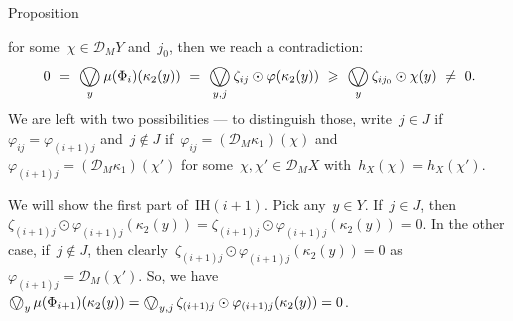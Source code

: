 \documentclass[b]{subfiles}
\begin{document}
\begin{parsec}
\begin{point}[aconvalmosteffectus]{Proposition}
\begin{point}
    for some~$\chi \in \mathcal{D}_M Y$ and~$j_0$,
    then we reach a contradiction:
\begin{equation*}
    0\ = \ 
    \bigovee_y \mu(\Phi_i)(\kappa_2(y))
    \ = \ \bigovee_{y,j} \zeta_{ij} \odot \varphi(\kappa_2(y))
    \ \geq \ \bigovee_y \zeta_{ij_0} \odot \chi(y)\  \neq\  0.
\end{equation*}
We are left with two possibilities ---
    to distinguish those,
    write~$j \in J$ if~$\varphi_{ij} = \varphi_{(i+1)j}$
    and~$j \notin J$
    if~$\varphi_{ij} = (\mathcal{D}_M \kappa_1)(\chi)$
    and~$\varphi_{(i+1)j} = (\mathcal{D}_M \kappa_1)(\chi')$
    for some~$\chi,\chi' \in \mathcal{D}_M X$
    with~$h_X (\chi) = h_X(\chi')$.

    We will show the first part of~$\mathrm{IH}(i+1)$.
Pick any~$y \in Y$.
If~$j \in J$, then~$\zeta_{(i+1)j}\odot \varphi_{(i+1)j}(\kappa_2(y))
= \zeta_{(i+1)j} \odot \varphi_{(i+1)j}(\kappa_2(y)) = 0$.
In the other case, if~$j \notin J$,
then clearly~$\zeta_{(i+1)j}\odot \varphi_{(i+1)j}(\kappa_2(y)) = 0$
    as~$\varphi_{(i+1)j} = \mathcal{D}_M(\chi')$.
So, we have~$\bigovee_y \mu(\Phi_{i+1})(\kappa_2(y))
= \bigovee_{y,j} \zeta_{(i+1)j} \odot \varphi_{(i+1)j} (\kappa_2(y)) = 0 $.


\end{point}
\end{point}
\end{parsec}
\end{document}

